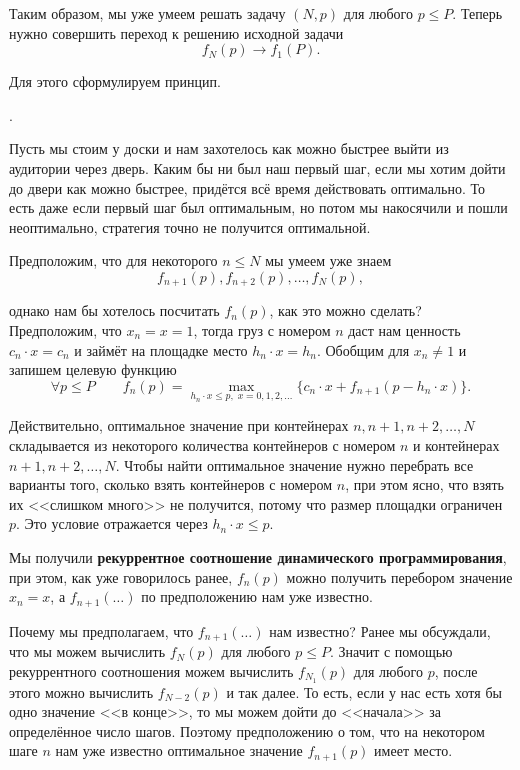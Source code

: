 Таким образом, мы уже умеем решать задачу $(N, p)$ для любого $p \le P$. Теперь нужно совершить переход к решению исходной задачи
\[
f_N(p) \longrightarrow f_1(P).
\]

Для этого сформулируем принцип.


.

\example

Пусть мы стоим у доски и нам захотелось как можно быстрее выйти из аудитории через дверь. Каким бы ни был наш первый шаг, если мы хотим дойти до двери как можно быстрее, придётся всё время действовать оптимально. То есть даже если первый шаг был оптимальным, но потом мы накосячили и пошли неоптимально, стратегия точно не получится оптимальной.

\returntoproblem

Предположим, что для некоторого $n \le N$ мы умеем уже знаем
\[
f_{n+1}(p), f_{n+2}(p), \dots, f_{N}(p),
\]

однако нам бы хотелось посчитать $f_n(p)$, как это можно сделать? Предположим, что $x_n = x = 1$, тогда груз с номером $n$ даст нам ценность $c_n \cdot x = c_n$ и займёт на площадке место $h_n \cdot x = h_n$. Обобщим для $x_n \neq 1$ и запишем целевую функцию
\[
\boxed{\forall p \le P \qquad f_n(p) = \max_{h_n \cdot x \le p, \; x = 0, 1, 2, \dots} \big\{c_n \cdot x + f_{n+1}(p - h_n \cdot x)\big\}}.
\]

Действительно, оптимальное значение при контейнерах $n, n+1, n+2, \dots, N$ складывается из некоторого количества контейнеров с номером $n$ и контейнерах $n+1, n+2, \dots, N$. Чтобы найти оптимальное значение нужно перебрать все варианты того, сколько взять контейнеров с номером $n$, при этом ясно, что взять их <<слишком много>> не получится, потому что размер площадки ограничен $p$. Это условие отражается через $h_n \cdot x \le p$.

Мы получили \textbf{рекуррентное соотношение динамического программирования}, при этом, как уже говорилось ранее, $f_n(p)$ можно получить перебором значение $x_n = x$, а $f_{n+1}(\dots)$ по предположению нам уже известно.

Почему мы предполагаем, что $f_{n+1}(\dots)$ нам известно? Ранее мы обсуждали, что мы можем вычислить $f_N(p)$ для любого $p \le P$. Значит с помощью рекуррентного соотношения можем вычислить $f_{N_1}(p)$ для любого $p$, после этого можно вычислить $f_{N-2}(p)$ и так далее. То есть, если у нас есть хотя бы одно значение <<в конце>>, то мы можем дойти до <<начала>> за определённое число шагов. Поэтому предположению о том, что на некотором шаге $n$ нам уже известно оптимальное значение $f_{n+1}(p)$ имеет место.

